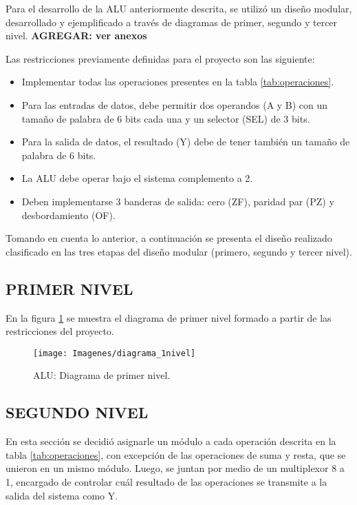 \documentclass[journal,trans]{IEEEtran}
\begin{document}
Para el desarrollo de la ALU anteriormente descrita, se utilizó un diseño modular, desarrollado y ejemplificado a través de diagramas de primer, segundo y tercer nivel. \textbf{AGREGAR: ver anexos}

Las restricciones previamente definidas para el proyecto son las siguiente:
\begin{itemize}
    \item Implementar todas las operaciones presentes en la tabla \ref{tab:operaciones}.
    \item Para las entradas de datos, debe permitir dos operandos (A y B) con un tamaño de palabra de 6 bits cada una y un selector (SEL) de 3 bits.
    \item Para la salida de datos, el resultado (Y) debe de tener también un tamaño de palabra de 6 bits.
    \item La ALU debe operar bajo el sistema complemento a 2.
    \item Deben implementarse 3 banderas de salida: cero (ZF), paridad par (PZ) y desbordamiento (OF).
\end{itemize}

Tomando en cuenta lo anterior, a continuación se presenta el diseño realizado clasificado en las tres etapas del diseño modular (primero, segundo y tercer nivel).


\subsection{PRIMER NIVEL}
En la figura \ref{fig:diagrama_1nivel} se muestra el diagrama de primer nivel formado a partir de las restricciones del proyecto.

\begin{figure}[!h]
	\centering
	\texttt{[image: Imagenes/diagrama\_1nivel]}
	\caption{ALU: Diagrama de primer nivel.}
	\label{fig:diagrama_1nivel}
\end{figure}


\subsection{SEGUNDO NIVEL}
En esta sección se decidió asignarle un módulo a cada operación descrita en la tabla \ref{tab:operaciones}, con excepción de las operaciones de suma y resta, que se unieron en un mismo módulo. Luego, se juntan por medio de un multiplexor 8 a 1, encargado de controlar cuál resultado de las operaciones se transmite a la salida del sistema como Y.
\end{document}
